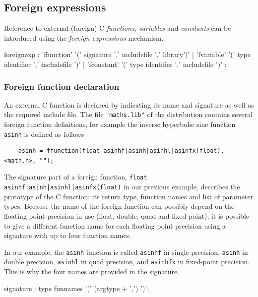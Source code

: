 \subsection{Foreign expressions}

Reference to external (foreign) C \textit{functions}, \textit{variables} and \textit{constants} can be introduced using the \textit{foreign expressions} mechanism.
 
\begin{rail}
foreignexp : 'ffunction' '(' signature ',' includefile ',' library')' 
          | 'fvariable' '(' type identifier ',' includefile ')' 
          | 'fconstant' '(' type identifier ',' includefile ')' ;
\end{rail}

\subsubsection{Foreign function declaration} 

An external C function is declared by indicating its name and signature as well as the required include file.
The file \lstinline'"maths.lib"' of the \faust distribution contains several foreign function definitions, for example the inverse hyperbolic sine function \lstinline'asinh' is defined as follows

\begin{lstlisting}
	asinh = ffunction(float asinhf|asinh|asinhl|asinfx(float), <math.h>, "");
\end{lstlisting}


The signature part of a foreign function, \lstinline'float asinhf|asinh|asinhl|asinfx(float)' in our previous example, describes the prototype of the C function: its return type, function names and list of parameter types. Because the name of the foreign function can possibly depend on the floating point precision in use (float, double, quad and fixed-point), it is possible to give a different function name for each floating point precision using a signature with up to four function names. 

In our example, the \lstinline'asinh' function is called \lstinline'asinhf' in single precision, \lstinline'asinh' in double precision, \lstinline'asinhl' in quad precision, and \lstinline'asinhfx' in fixed-point precision. This is why the four names are provided in the signature.


\begin{rail}
signature : type funnames '(' (argtype + ',') ')';
\end{rail}

